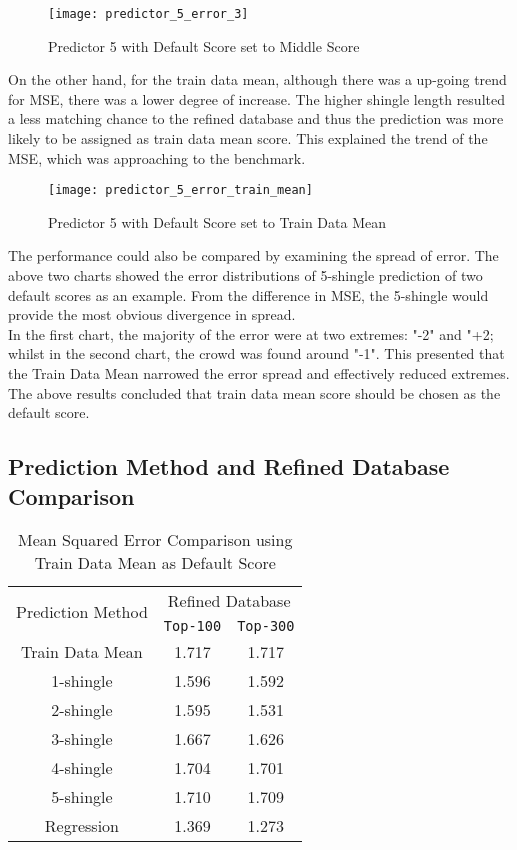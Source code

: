 \begin{figure}[H]
\texttt{[image: predictor\_5\_error\_3]}
\caption{Predictor 5 with Default Score set to Middle Score}
\end{figure}

On the other hand, for the train data mean, although there was a up-going trend for MSE, there was a lower degree of increase.
The higher shingle length resulted a less matching chance to the refined database and thus the prediction was more likely to be assigned as train data mean score. This explained the trend of the MSE, which was approaching to the benchmark.

\begin{figure}
\texttt{[image: predictor\_5\_error\_train\_mean]}
\caption{Predictor 5 with Default Score set to Train Data Mean}
\end{figure}

The performance could also be compared by examining the spread of error. The above two charts showed the error distributions of 5-shingle prediction of two default scores as an example. From the difference in MSE, the 5-shingle would provide the most obvious divergence in spread.\\
In the first chart, the majority of the error were at two extremes: "-2" and "+2; whilst in the second chart, the crowd was found around "-1". This presented that the Train Data Mean narrowed the error spread and effectively reduced extremes.
The above results concluded that train data mean score should be chosen as the default score.




\subsection{Prediction Method and Refined Database Comparison}

\begin{table}[H]
\caption{Mean Squared Error Comparison using Train Data Mean as Default Score}
	\begin{tabular}{ccc}
			\toprule
				\multirow{2}{*}{Prediction Method} &
				\multicolumn{2}{c}{Refined Database}\\
				\cline{2-3}
				& \texttt{Top-100} &  \texttt{Top-300} \\
			\midrule
				Train Data Mean & 1.717 & 1.717 \\
				\hline
				1-shingle & 1.596 & 1.592\\
				2-shingle & 1.595 & 1.531\\
				3-shingle & 1.667 & 1.626\\
				4-shingle & 1.704 & 1.701\\
				5-shingle & 1.710 & 1.709\\
				\hline
				Regression & 1.369 & 1.273\\

			\bottomrule
		\end{tabular}

\end{table}

